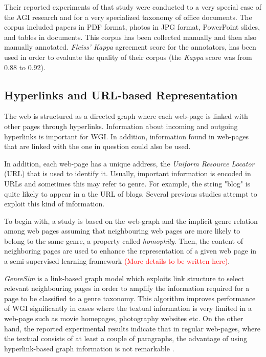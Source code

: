 Their reported experiments of that study were conducted to a very special case of  the AGI research and for a very specialized taxonomy of office documents. The corpus included papers in PDF format, photos in JPG format, PowerPoint slides, and tables in documents. This corpus has been collected manually and then also manually annotated. \textit{Fleiss' Kappa} agreement score for the annotators, has been used in order to evaluate the quality of their corpus (the \textit{Kappa} score was from 0.88 to 0.92).

\subsection{Hyperlinks and URL-based Representation}
\label{chap:relevant_work:sec:url}

The web is structured as a directed graph where each web-page is linked with other pages through hyperlinks. Information about incoming and outgoing hyperlinks is important for WGI. In addition, information found in web-pages that are linked with the one in question could also be used.

In addition, each web-page has a unique address, the \textit{Uniform Resource Locator} (URL) that is used to identify it. Usually, important information is encoded in URLs and sometimes this may refer to genre. For example, the string "blog" is quite likely to appear in a the URL of blogs. Several previous studies attempt to exploit this kind of information.

To begin with, a study is based on the web-graph and the implicit genre relation among web pages assuming that neighbouring web pages are more likely to belong to the same genre, a property called \textit{homophily}. Then, the content of neighboring pages are used to enhance the representation of a given web page in a semi-supervised learning framework \parencite{asheghi2014semi} \textcolor{red}{(More details to be written here)}.

\textit{GenreSim} is a link-based graph model which exploits link structure to select relevant neighbouring pages in order to amplify the information required for a page to be classified to a genre taxonomy. This algorithm improves performance of WGI significantly in cases where the textual information is very limited in a web-page such as movie homepages, photography websites etc. On the other hand, the reported experimental results indicate that in regular web-pages, where the textual consists of at least a couple of paragraphs, the advantage of using hyperlink-based graph information is not remarkable \parencite{zhu2011enhance,zhu2016exploiting}.

